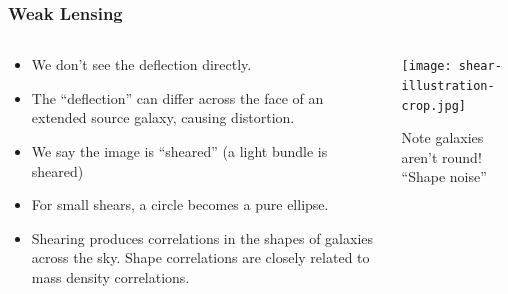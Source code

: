 \documentclass{beamer}
\begin{document}
\frame
{

    \frametitle{Weak Lensing}

    \fontsize{10}{0.8\baselineskip}

    \begin{columns}

        \begin{column}{0.5\textwidth}

            \begin{itemize}

                \item We don't see the deflection directly.

                \item The ``deflection'' can differ across the face of an
                    extended source galaxy, causing distortion.

                \item We say the image is ``sheared'' (a light bundle 
                    is sheared)

                \item For small shears, a circle becomes a pure ellipse.

                \item Shearing produces correlations in the shapes of galaxies across the sky.
                    Shape correlations are closely related to mass density
                    correlations.

            \end{itemize}
        \end{column}
        \begin{column}{0.5\textwidth}
            \texttt{[image: shear-illustration-crop.jpg]}
            \newline
            \begin{center}
                {\small Note galaxies aren't round!  ``Shape noise''}
            \end{center}
        \end{column}
    \end{columns}
}
\end{document}
